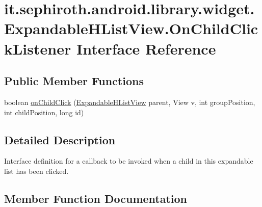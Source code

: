 \hypertarget{interfaceit_1_1sephiroth_1_1android_1_1library_1_1widget_1_1_expandable_h_list_view_1_1_on_child_click_listener}{}\section{it.\+sephiroth.\+android.\+library.\+widget.\+Expandable\+H\+List\+View.\+On\+Child\+Click\+Listener Interface Reference}
\label{interfaceit_1_1sephiroth_1_1android_1_1library_1_1widget_1_1_expandable_h_list_view_1_1_on_child_click_listener}
\subsection*{Public Member Functions}
\begin{DoxyCompactItemize}
\item 
boolean \hyperlink{interfaceit_1_1sephiroth_1_1android_1_1library_1_1widget_1_1_expandable_h_list_view_1_1_on_child_click_listener_a6f98c39d7adf25b6b00ae2fdd62e159b}{on\+Child\+Click} (\hyperlink{classit_1_1sephiroth_1_1android_1_1library_1_1widget_1_1_expandable_h_list_view}{Expandable\+H\+List\+View} parent, View v, int group\+Position, int child\+Position, long id)
\end{DoxyCompactItemize}


\subsection{Detailed Description}
Interface definition for a callback to be invoked when a child in this expandable list has been clicked. 

\subsection{Member Function Documentation}
\mbox{\label{interfaceit_1_1sephiroth_1_1android_1_1library_1_1widget_1_1_expandable_h_list_view_1_1_on_child_click_listener_a6f98c39d7adf25b6b00ae2fdd62e159b}} 
